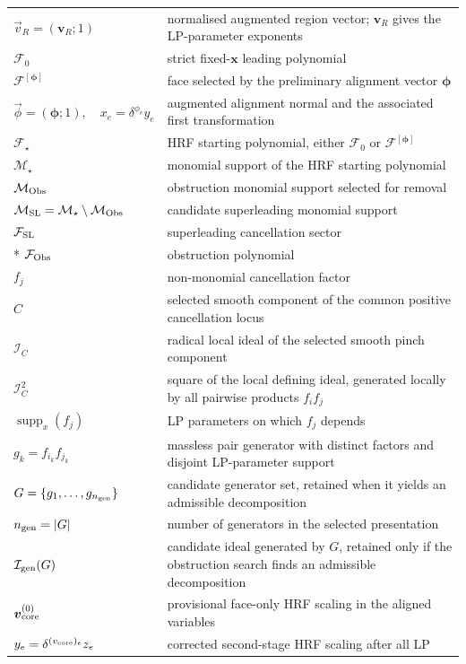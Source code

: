 \documentclass[a4paper,11pt]{article}
\newcommand{\x}{\boldsymbol{x}}
\newcommand{\FSL}{\mathcal F_{\rm SL}}
\newcommand{\MSL}{\mathcal M_{\rm SL}}
\newcommand{\MObs}{\mathcal M_{\rm Obs}}
\newcommand{\FObs}{\mathcal F_{\rm Obs}}
\newcommand{\ideal}{\mathcal I}
\begin{document}
\begin{longtable}{@{}p{}p{}@{}}
\(\vec v_R=(\boldsymbol v_R;1)\) & normalised augmented region vector;
  \(\boldsymbol v_R\) gives the LP-parameter exponents\\
\(\mathcal F_0\) & strict fixed-\(\x\) leading polynomial\\
\(\mathcal F^{[\boldsymbol\phi]}\) & face selected by the preliminary alignment vector
  \(\boldsymbol\phi\)\\
\(\vec\phi=(\boldsymbol\phi;1),\quad x_e=\delta^{\phi_e}y_e\) & augmented
  alignment normal and the associated first transformation\\
\(\mathcal F_\star\) & HRF starting polynomial, either
  \(\mathcal F_0\) or \(\mathcal F^{[\boldsymbol\phi]}\)\\
\(\mathcal M_\star\) & monomial support of the HRF starting polynomial\\
\(\MObs\) & obstruction monomial support selected for removal\\
\(\MSL=\mathcal M_\star\setminus\MObs\) & candidate superleading monomial
  support\\
\(\FSL\) & superleading cancellation sector\\*
\(\FObs\) & obstruction polynomial\\
\(f_j\) & non-monomial cancellation factor\\
\(C\) & selected smooth component of the common positive cancellation locus\\
\(\ideal_C\) & radical local ideal of the selected smooth pinch component\\
\(\ideal_C^2\) & square of the local defining ideal, generated locally by all
  pairwise products \(f_if_j\)\\
\(\operatorname{supp}_x(f_j)\) & LP parameters on which \(f_j\) depends\\
\(g_k=f_{i_k}f_{j_k}\) & massless pair generator with distinct factors and
  disjoint LP-parameter support\\
\(G=\{g_1,\ldots,g_{n_{\rm gen}}\}\) & candidate generator set, retained when
  it yields an admissible decomposition\\
\(n_{\rm gen}=|G|\) & number of generators in the selected presentation\\
\(\mathcal I_{\rm gen}(G)\) & candidate ideal generated by \(G\), retained
  only if the obstruction search finds an admissible decomposition\\
\(\boldsymbol v_{\rm core}^{(0)}\) & provisional face-only HRF scaling in the aligned
  variables\\
\(y_e=\delta^{(v_{\rm core})_e}z_e\) & corrected second-stage HRF scaling after all LP

\end{longtable}
\end{document}
